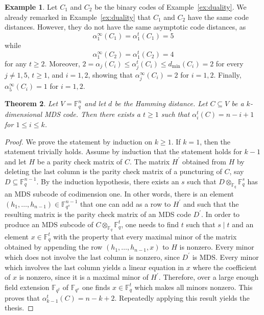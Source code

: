 \documentclass[12pt]{amsart}
\numberwithin{equation}{section}
\newtheorem{theorem}{Theorem}[section]
\theoremstyle{definition}
\newtheorem{example}[theorem]{Example}
\newcommand{\FF}{\mathbb{F}}
\begin{document}
\begin{example}
Let $C_1$ and $C_2$ be the binary codes of Example~\ref{ex:duality}. We already remarked in Example~\ref{ex:duality} that $C_1$ and $C_2$ have the same code distances. However, they do not have the same asymptotic code distances, as $$\alpha_1^\infty(C_1)=\alpha_1^t(C_1)=5$$ while $$\alpha_1^\infty(C_2)=\alpha_1^t(C_2)=4$$ for any $t\geq 2$. %
Moreover, $2=\alpha_j(C_i)\leq \alpha_j^t(C_i)\leq d_{\min}(C_i)=2$ for every $j\neq 1,5$, $t\geq 1$, and $i=1,2$, showing that $\alpha_j^\infty(C_i)=2$ for $i=1,2$. Finally, $\alpha_5^\infty(C_i)=1$ for $i=1,2$.
\end{example}

\begin{theorem}\label{thm:chainMDS}
Let $V=\FF_q^n$ and let $d$ be the Hamming distance. Let $C\subseteq V$ be a $k$-dimensional MDS code. Then there exists a $t\geq 1$ such that $\alpha_{i}^t(C)=n-i+1$ for $1\leq i\leq k$.
\end{theorem}

\begin{proof}
We prove the statement by induction on $k\geq 1$. If $k=1$, then the statement trivially holds. Assume by induction that the statement holds for $k-1$ and let $H$ be a parity check matrix of $C$. The matrix $H^\prime$ obtained from $H$ by deleting the last column is the parity check matrix of a puncturing of $C$, say $D\subseteq\FF_q^{n-1}$. By the induction hypothesis, there exists an $s$ such that $D\otimes_{\FF_q}\FF_q^s$ has an MDS subcode of codimension one. In other words, there is an element $(h_1,\ldots,h_{n-1})\in\FF_{q^s}^{n-1}$ that one can add as a row to $H^\prime$ and such that the resulting matrix is the parity check matrix of an MDS code $D^\prime$. In order to produce an MDS subcode of $C\otimes_{\FF_q}\FF_q^{t}$, one needs to find $t$ such that $s\mid t$ and an element $x\in\FF_q^{t}$ with the property that every maximal minor of the matrix obtained by appending the row $(h_1,\ldots,h_{n-1},x)$ to $H$ is nonzero. Every minor which does not involve the last column is nonzero, since $D^\prime$ is MDS. Every minor which involves the last column yields a linear equation in $x$ where the coefficient of $x$ is nonzero, since it is a maximal minor of $H^\prime$. Therefore, over a large enough field extension $\FF_{q^t}$ of $\FF_{q^s}$ one finds $x\in\FF_q^{t}$ which makes all minors nonzero. This proves that $\alpha_{k-1}^{t}(C)=n-k+2$. Repeatedly applying this result yields the thesis.
\end{proof}
\end{document}
